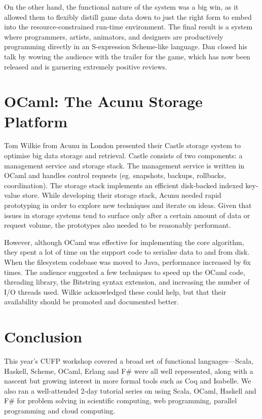 \documentclass{jfp1}
\begin{document}
On the other hand, the functional nature of the system was a big win, as it
allowed them to flexibly distill game data down to just the right form to embed
into the resource-constrained run-time environment.  The final result is a
system where programmers, artists, animators, and designers are productively
programming directly in an S-expression Scheme-like language.  Dan closed his
talk by wowing the audience with the trailer for the game, which has now been
released and is garnering extremely positive reviews.

\section{OCaml: The Acunu Storage Platform}

Tom Wilkie from Acunu in London presented their Castle storage system to
optimise big data storage and retrieval. Castle consists of two components: a
management service and storage stack.  The management service is written in
OCaml and handles control requests (eg. snapshots, backups, rollbacks,
coordination). The storage stack implements an efficient disk-backed indexed
key-value store. While developing their storage stack, Acunu needed rapid
prototyping in order to explore new techniques and iterate on ideas. Given that
issues in storage systems tend to surface only after a certain amount of data
or request volume, the prototypes also needed to be reasonably performant.

However, although OCaml was effective for implementing the core algorithm, they
spent a lot of time on the support code to serialise data to and from disk.
When the filesystem codebase was moved to Java, performance increased by 6x
times. The audience suggested a few techniques to speed up the OCaml code,
threading library, the Bitstring syntax extension, and increasing the number of
I/O threads used.  Wilkie acknowledged these could help, but that their
availability should be promoted and documented better.

\section{Conclusion}

This year's CUFP workshop covered a broad set of functional languages---Scala,
Haskell, Scheme, OCaml, Erlang and F\# were all well represented, along with a
nascent but growing interest in more formal tools such as Coq and Isabelle.  We
also ran a well-attended 2-day tutorial series on using Scala, OCaml, Haskell and
F\# for problem solving in scientific computing, web programming, parallel
programming and cloud computing. 
\end{document}
